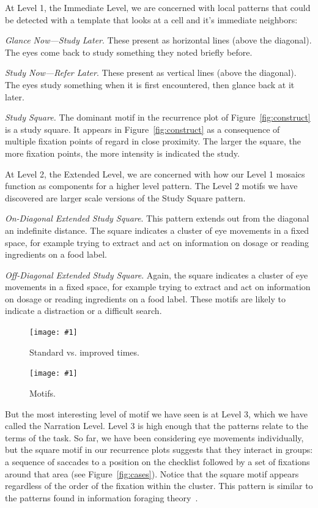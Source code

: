 \documentclass[journal]{vgtc}                %
\newcommand{\insertpicture}[2]{\begin{center}\texttt{[image: \#1]}\end{center}}
\begin{document}
At Level 1, the Immediate Level, we are concerned with local patterns that could be detected with a template that looks at a cell and it's immediate neighbors:

\emph{Glance Now—Study Later}. These present as horizontal lines (above the
diagonal). The eyes come back to study something they noted briefly before.

\emph{Study Now—Refer Later}. These present as vertical lines (above the
diagonal). The eyes study something when it is first encountered, then
glance back at it later.

\emph{Study Square.} The dominant motif in the recurrence plot of Figure~\ref{fig:construct} is a study square. It appears in  Figure~\ref{fig:construct} as a consequence of multiple fixation 
points of regard in close proximity. The larger the square, the 
more fixation points, the more intensity is indicated the study.

At Level 2, the Extended Level, we are concerned with how our Level 1 mosaics function as components for a higher level pattern. The Level 2 motifs we have discovered are larger scale versions of the Study Square pattern.

\emph{On-Diagonal Extended Study Square}.  This pattern extends out from the diagonal an indefinite distance. The square indicates a cluster of eye movements in a fixed space, for example trying to extract and act on information on dosage or reading ingredients on a food label.

\emph{Off-Diagonal Extended Study Square}.  Again, the square indicates a cluster of eye movements in a fixed space, for example trying to extract and act on information on dosage or reading ingredients on a food label. These motifs are likely to indicate a distraction or a difficult search.

\begin{figure}
\insertpicture{figures/time.pdf}{0.5}
\caption{Standard vs. improved times.\label{fig:time}}
\end{figure}

\begin{figure}
\insertpicture{figures/motifs.pdf}{0.5}
\caption{Motifs.\label{fig:motifs}}
\end{figure}

But the most interesting level of motif we have seen is at Level 3, which we have called the Narration Level. Level 3 is high enough that the patterns relate to the terms of the task.  So
far, we have been considering eye movements individually, but the square
motif in our recurrence plots suggests that they interact in groups: a
sequence of saccades to a position on the checklist followed by a set of
fixations around that area (see Figure~\ref{fig:cases}).  Notice that 
the square motif appears regardless of the order of the fixation within 
the cluster. This pattern is similar to the patterns found in information 
foraging theory~\cite{Pirolli_1999}. 
\end{document}
